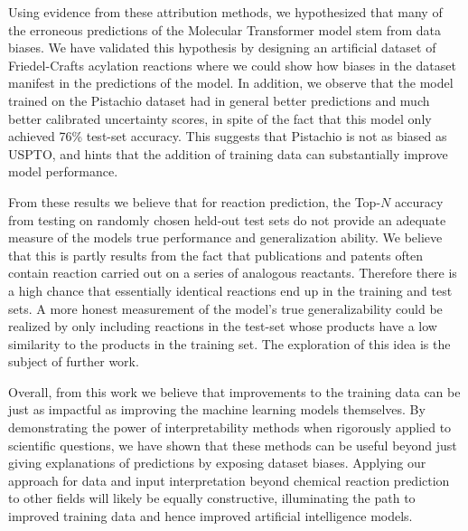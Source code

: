 Using evidence from these attribution methods, we hypothesized that many of the erroneous predictions of the Molecular Transformer model stem from data biases. We have validated this hypothesis by designing an artificial dataset of Friedel-Crafts acylation reactions where we could show how biases in the dataset manifest in the predictions of the model. In addition, we observe that the model trained on the Pistachio dataset had in general better predictions and much better calibrated uncertainty scores, in spite of the fact that this model only achieved 76\% test-set accuracy. This suggests that Pistachio is not as biased as USPTO, and hints that the addition of training data can substantially improve model performance. 

From these results we believe that for reaction prediction, the Top-$N$ accuracy from testing on randomly chosen held-out test sets do not provide an adequate measure of the models true performance and generalization ability. We believe that this is partly results from the fact that publications and patents often contain reaction carried out on a series of analogous reactants. Therefore there is a high chance that essentially identical reactions end up in the training and test sets. A more honest measurement of the model's true generalizability could be realized by only including reactions in the test-set whose products have a low similarity to the products in the training set. The exploration of this idea is the subject of further work. 

Overall, from this work we believe that improvements to the training data can be just as impactful as improving the machine learning models themselves. By demonstrating the power of interpretability methods when rigorously applied to scientific questions, we have shown that these methods can be useful beyond just giving explanations of predictions by exposing dataset biases. Applying our approach for data and input interpretation beyond chemical reaction prediction to other fields will likely be equally constructive, illuminating the path to improved training data and hence improved artificial intelligence models.